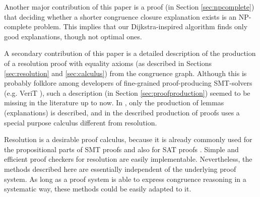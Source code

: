 Another major contribution of this paper is a proof (in Section
\ref{sec:npcomplete}) that deciding whether a shorter congruence
closure explanation exists is an NP-complete problem. This implies
that our Dijkstra-inspired algorithm finds only good explanations,
though not optimal ones.

A secondary contribution of this paper is a detailed description of
the production of a resolution proof with equality axioms (as
described in Sections \ref{sec:resolution} and \ref{sec:calculus})
from the congruence graph. Although this is probably folklore among
developers of fine-grained proof-producing SMT-solvers (e.g. VeriT
\cite{ToDo}), such a description (in Section
\ref{sec:proofproduction}) seemed to be missing in the literature up
to now. In \cite{Nieuwenhuis2005,Nieuwenhuis2007}, only the
production of lemmas (explanations) is described, and in
\cite{Fontaine2004} the described production of proofs uses a special
purpose calculus different from resolution.

Resolution is a desirable proof calculus, because it is already
commonly used for the propositional parts of SMT proofs and also for
SAT proofs \cite{ToDo}. Simple
and efficient proof checkers for resolution are easily implementable.
Nevertheless, the methods described here are essentially independent
of the underlying proof system. As long as a proof system is able to
express congruence reasoning in a systematic way, these methods could
be easily adapted to it.
